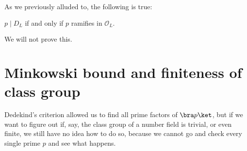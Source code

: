 \documentclass[a4paper]{article}
\begin{document}
%

As we previously alluded to, the following is true:
\begin{thm}
  $p \mid D_L$ if and only if $p$ ramifies in $\mathcal{O}_L$.
\end{thm}

We will not prove this.

\section{Minkowski bound and finiteness of class group}
Dedekind's criterion allowed us to find all prime factors of $\bra p\ket$, but if we want to figure out if, say, the class group of a number field is trivial, or even finite, we still have no idea how to do so, because we cannot go and check every single prime $p$ and see what happens.

\end{document}

